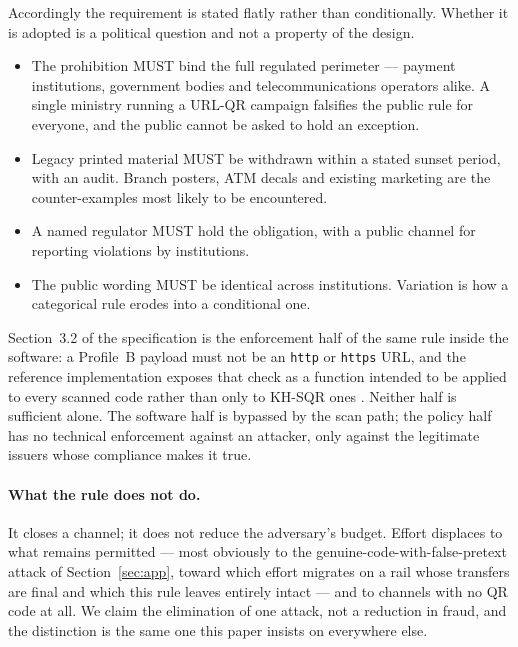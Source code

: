 \documentclass[10pt,a4paper,twocolumn]{article}
\newcommand{\code}[1]{\texttt{\small #1}}
\begin{document}
Accordingly the requirement is stated flatly rather than conditionally. Whether
it is adopted is a political question and not a property of the design.

\begin{itemize}[leftmargin=1.4em]
  \item The prohibition MUST bind the full regulated perimeter --- payment
    institutions, government bodies and telecommunications operators alike.
    A single ministry running a URL-QR campaign falsifies the public rule for
    everyone, and the public cannot be asked to hold an exception.
  \item Legacy printed material MUST be withdrawn within a stated sunset period,
    with an audit. Branch posters, ATM decals and existing marketing are the
    counter-examples most likely to be encountered.
  \item A named regulator MUST hold the obligation, with a public channel for
    reporting violations by institutions.
  \item The public wording MUST be identical across institutions. Variation is
    how a categorical rule erodes into a conditional one.
\end{itemize}

Section~3.2 of the specification is the enforcement half of the same rule inside
the software: a Profile~B payload must not be an \code{http} or \code{https}
URL, and the reference implementation exposes that check as a function intended
to be applied to every scanned code rather than only to KH-SQR ones
\citep{khsqr2026repo}. Neither half is sufficient alone. The software half is
bypassed by the scan path; the policy half has no technical enforcement against
an attacker, only against the legitimate issuers whose compliance makes it true.

\paragraph{What the rule does not do.}
It closes a channel; it does not reduce the adversary's budget. Effort displaces
to what remains permitted --- most obviously to the genuine-code-with-false-pretext
attack of Section~\ref{sec:app}, toward which effort migrates on a rail whose
transfers are final and which this rule leaves entirely intact --- and to channels with no QR code at all.
We claim the elimination of one attack, not a reduction in fraud, and the
distinction is the same one this paper insists on everywhere else.
\end{document}
